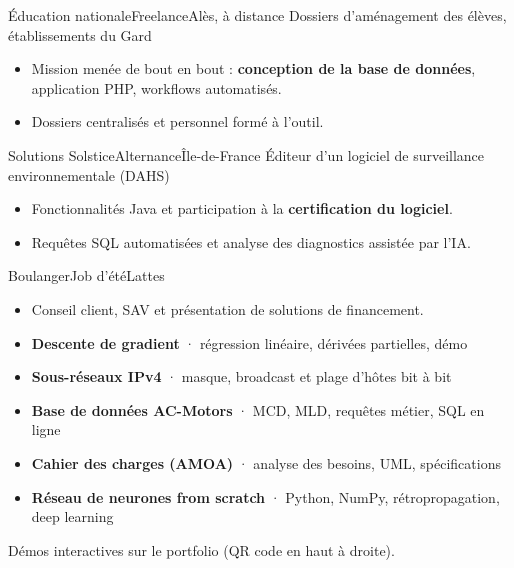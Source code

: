 \begin{minipage}[t]{\mainwidth}
  {Éducation nationale}{Freelance}{Alès, à distance}
  {Dossiers d'aménagement des élèves, établissements du Gard}
\begin{itemize}
  \item Mission menée de bout en bout : \textbf{conception de la base de données}, application PHP, workflows automatisés.
  \item Dossiers centralisés et personnel formé à l'outil.
\end{itemize}

  {Solutions Solstice}{Alternance}{Île-de-France}
  {Éditeur d'un logiciel de surveillance environnementale (DAHS)}
\begin{itemize}
  \item Fonctionnalités Java et participation à la \textbf{certification du logiciel}.
  \item Requêtes SQL automatisées et analyse des diagnostics assistée par l'IA.
\end{itemize}

  {Boulanger}{Job d'été}{Lattes}{}
\begin{itemize}
  \item Conseil client, SAV et présentation de solutions de financement.
\end{itemize}

\begin{itemize}[itemsep=1pt]
  \item \textbf{Descente de gradient} {\color{muted}· régression linéaire, dérivées partielles, démo}
  \item \textbf{Sous-réseaux IPv4} {\color{muted}· masque, broadcast et plage d'hôtes bit à bit}
  \item \textbf{Base de données AC-Motors} {\color{muted}· MCD, MLD, requêtes métier, SQL en ligne}
  \item \textbf{Cahier des charges (AMOA)} {\color{muted}· analyse des besoins, UML, spécifications}
  \item \textbf{Réseau de neurones from scratch} {\color{muted}· Python, NumPy, rétropropagation, deep learning}
\end{itemize}
{\small\color{muted}Démos interactives sur le portfolio (QR code en haut à droite).}

\end{minipage}%
\hfill%
